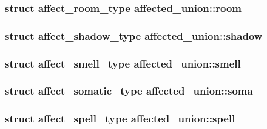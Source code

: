 \hypertarget{unionaffected__union_aa7f04e0b35d76e5783d10369d6f607d7}{
\subsubsection[{room}]{\setlength{\rightskip}{0pt plus 5cm}struct {\bf affect\-\_\-room\-\_\-type} affected\-\_\-union\-::room}}\label{unionaffected__union_aa7f04e0b35d76e5783d10369d6f607d7}
\hypertarget{unionaffected__union_a897dfa51b71113ca548535de1b524f41}{
\subsubsection[{shadow}]{\setlength{\rightskip}{0pt plus 5cm}struct {\bf affect\-\_\-shadow\-\_\-type} affected\-\_\-union\-::shadow}}\label{unionaffected__union_a897dfa51b71113ca548535de1b524f41}
\hypertarget{unionaffected__union_ae141f4b53190ba959fbb62baa1ef8156}{
\subsubsection[{smell}]{\setlength{\rightskip}{0pt plus 5cm}struct {\bf affect\-\_\-smell\-\_\-type} affected\-\_\-union\-::smell}}\label{unionaffected__union_ae141f4b53190ba959fbb62baa1ef8156}
\hypertarget{unionaffected__union_a02145b6a5363511a3ded9c0887f86968}{
\subsubsection[{soma}]{\setlength{\rightskip}{0pt plus 5cm}struct {\bf affect\-\_\-somatic\-\_\-type} affected\-\_\-union\-::soma}}\label{unionaffected__union_a02145b6a5363511a3ded9c0887f86968}
\hypertarget{unionaffected__union_abc69e41b5a0c0862865995786229f28c}{
\subsubsection[{spell}]{\setlength{\rightskip}{0pt plus 5cm}struct {\bf affect\-\_\-spell\-\_\-type} affected\-\_\-union\-::spell}}\label{unionaffected__union_abc69e41b5a0c0862865995786229f28c}

